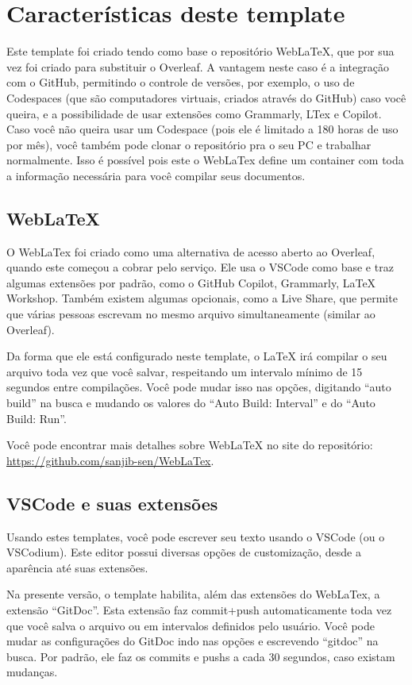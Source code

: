   \section{Características deste template}
    Este template foi criado tendo como base o repositório Web\LaTeX{}, que por sua vez foi criado para substituir o Overleaf. A vantagem neste caso é a integração com o GitHub, permitindo o controle de versões, por exemplo, o uso de Codespaces (que são computadores virtuais, criados através do GitHub) caso você queira, e a possibilidade de usar extensões como Grammarly, LTex e Copilot. Caso você não queira usar um Codespace (pois ele é limitado a 180 horas de uso por mês), você também pode clonar o repositório pra o seu PC e trabalhar normalmente. Isso é possível pois este o WebLaTex define um container com toda a informação necessária para você compilar seus documentos.

    \subsection{Web\LaTeX{}}
      O WebLaTex foi criado como uma alternativa de acesso aberto ao Overleaf, quando este começou a cobrar pelo serviço. Ele usa o VSCode como base e traz algumas extensões por padrão, como o GitHub Copilot, Grammarly, \LaTeX{} Workshop. Também existem algumas opcionais, como a Live Share, que permite que várias pessoas escrevam no mesmo arquivo simultaneamente (similar ao Overleaf).

      Da forma que ele está configurado neste template, o \LaTeX{} irá compilar o seu arquivo toda vez que você salvar, respeitando um intervalo mínimo de 15 segundos entre compilações. Você pode mudar isso nas opções, digitando ``auto build'' na busca e mudando os valores do ``Auto Build: Interval'' e do ``Auto Build: Run''.

      Você pode encontrar mais detalhes sobre Web\LaTeX{} no site do repositório: \url{https://github.com/sanjib-sen/WebLaTex}.

    \subsection{VSCode e suas extensões}
      Usando estes templates, você pode escrever seu texto usando o VSCode (ou o VSCodium). Este editor possui diversas opções de customização, desde a aparência até suas extensões.

      Na presente versão, o template habilita, além das extensões do WebLaTex, a extensão ``GitDoc''. Esta extensão faz commit+push automaticamente toda vez que você salva o arquivo ou em intervalos definidos pelo usuário. Você pode mudar as configurações do GitDoc indo nas opções e escrevendo ``gitdoc'' na busca. Por padrão, ele faz os commits e pushs a cada 30 segundos, caso existam mudanças.

